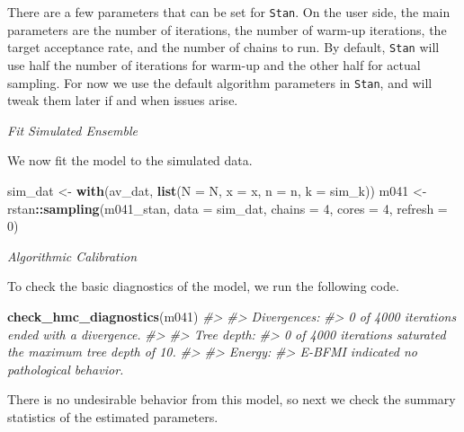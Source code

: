 \documentclass[11pt, oneside, openany]{scrbook}
\newenvironment{Shaded}{\begin{snugshade}}{\end{snugshade}}
\newcommand{\CommentTok}[1]{\textcolor[rgb]{0.56,0.35,0.01}{\textit{#1}}}
\newcommand{\DataTypeTok}[1]{\textcolor[rgb]{0.13,0.29,0.53}{#1}}
\newcommand{\DecValTok}[1]{\textcolor[rgb]{0.00,0.00,0.81}{#1}}
\newcommand{\KeywordTok}[1]{\textcolor[rgb]{0.13,0.29,0.53}{\textbf{#1}}}
\newcommand{\NormalTok}[1]{#1}
\newcommand{\OperatorTok}[1]{\textcolor[rgb]{0.81,0.36,0.00}{\textbf{#1}}}
\newcommand{\StringTok}[1]{\textcolor[rgb]{0.31,0.60,0.02}{#1}}
\begin{document}
There are a few parameters that can be set for \texttt{Stan}. On the user side, the main parameters are the number of iterations, the number of warm-up iterations, the target acceptance rate, and the number of chains to run. By default, \texttt{Stan} will use half the number of iterations for warm-up and the other half for actual sampling. For now we use the default algorithm parameters in \texttt{Stan}, and will tweak them later if and when issues arise.

\emph{Fit Simulated Ensemble}

We now fit the model to the simulated data.


\begin{Shaded}
\begin{Highlighting}[]
\NormalTok{sim_dat <-}\StringTok{ }\KeywordTok{with}\NormalTok{(av_dat, }\KeywordTok{list}\NormalTok{(}\DataTypeTok{N =}\NormalTok{ N, }\DataTypeTok{x =}\NormalTok{ x, }\DataTypeTok{n =}\NormalTok{ n, }\DataTypeTok{k =}\NormalTok{ sim_k)) }
\NormalTok{m041 <-}\StringTok{ }\NormalTok{rstan}\OperatorTok{::}\KeywordTok{sampling}\NormalTok{(m041_stan, }\DataTypeTok{data =}\NormalTok{ sim_dat, }
                        \DataTypeTok{chains =} \DecValTok{4}\NormalTok{, }\DataTypeTok{cores =} \DecValTok{4}\NormalTok{, }\DataTypeTok{refresh =} \DecValTok{0}\NormalTok{)}
\end{Highlighting}
\end{Shaded}


\emph{Algorithmic Calibration}

To check the basic diagnostics of the model, we run the following code.


\begin{Shaded}
\begin{Highlighting}[]
\KeywordTok{check_hmc_diagnostics}\NormalTok{(m041)}
\CommentTok{#> }
\CommentTok{#> Divergences:}
\CommentTok{#> 0 of 4000 iterations ended with a divergence.}
\CommentTok{#> }
\CommentTok{#> Tree depth:}
\CommentTok{#> 0 of 4000 iterations saturated the maximum tree depth of 10.}
\CommentTok{#> }
\CommentTok{#> Energy:}
\CommentTok{#> E-BFMI indicated no pathological behavior.}
\end{Highlighting}
\end{Shaded}


There is no undesirable behavior from this model, so next we check the summary statistics of the estimated parameters.
\end{document}
